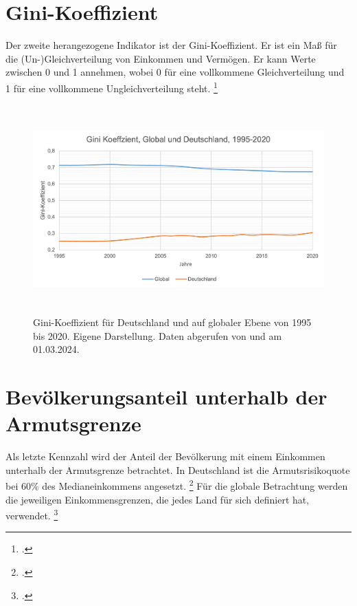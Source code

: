 \section{Gini-Koeffizient}

Der zweite herangezogene Indikator ist der Gini-Koeffizient. Er ist ein Maß für die (Un-)Gleichverteilung von Einkommen und Vermögen. Er kann Werte zwischen 0 und 1 annehmen, wobei 0 für eine vollkommene Gleichverteilung und 1 für eine vollkommene Ungleichverteilung steht. \footcite[Vgl.][]{gini_definition_diw_2024}

\begin{figure}[H]
    \centering
    \includegraphics[height=8cm]{Bilder/Gini-Koeffizient2.png}
    \caption[Gini-Koeffizient, Deutschland und global, 1995-2020]{Gini-Koeffizient für Deutschland und auf globaler Ebene von 1995 bis 2020. Eigene Darstellung. Daten abgerufen von \cite[][, S.56 (global)]{wir_2022} und \cite[][(Deutschland)]{bmas_arb_gini_2020} am 01.03.2024.}
    \label{fig:iso_norm}
\end{figure}

\section{Bevölkerungsanteil unterhalb der Armutsgrenze}

Als letzte Kennzahl wird der Anteil der Bevölkerung mit einem Einkommen unterhalb der Armutsgrenze betrachtet. In Deutschland ist die Armutsrisikoquote bei 60\% des Medianeinkommens angesetzt. \footcite[Vgl.][]{bmas_arb_armutsrisikoquote_2023} Für die globale Betrachtung werden die jeweiligen Einkommensgrenzen, die jedes Land für sich definiert hat, verwendet. \footcite[Vgl.][]{wb_armutsquote_global_2022}

